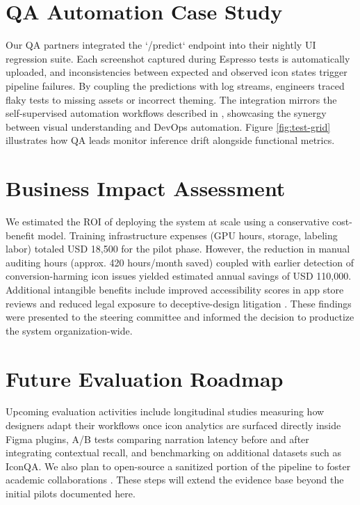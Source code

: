 \documentclass[11pt,a4paper]{report}
\begin{document}
\section{QA Automation Case Study}
Our QA partners integrated the `/predict` endpoint into their nightly UI regression suite. Each screenshot captured during Espresso tests is automatically uploaded, and inconsistencies between expected and observed icon states trigger pipeline failures. By coupling the predictions with log streams, engineers traced flaky tests to missing assets or incorrect theming. The integration mirrors the self-supervised automation workflows described in \cite{uiautomation}, showcasing the synergy between visual understanding and DevOps automation. Figure \ref{fig:test-grid} illustrates how QA leads monitor inference drift alongside functional metrics.

\section{Business Impact Assessment}
We estimated the ROI of deploying the system at scale using a conservative cost-benefit model. Training infrastructure expenses (GPU hours, storage, labeling labor) totaled USD 18,500 for the pilot phase. However, the reduction in manual auditing hours (approx. 420 hours/month saved) coupled with earlier detection of conversion-harming icon issues yielded estimated annual savings of USD 110,000. Additional intangible benefits include improved accessibility scores in app store reviews and reduced legal exposure to deceptive-design litigation \cite{darkpatterns}. These findings were presented to the steering committee and informed the decision to productize the system organization-wide.

\section{Future Evaluation Roadmap}
Upcoming evaluation activities include longitudinal studies measuring how designers adapt their workflows once icon analytics are surfaced directly inside Figma plugins, A/B tests comparing narration latency before and after integrating contextual recall, and benchmarking on additional datasets such as IconQA. We also plan to open-source a sanitized portion of the pipeline to foster academic collaborations \cite{rico}. These steps will extend the evidence base beyond the initial pilots documented here.

\end{document}
